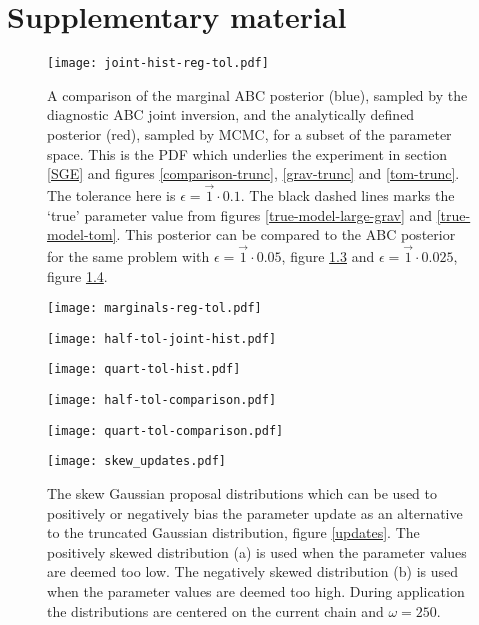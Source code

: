 \chapter{Supplementary material}
\label{supplementary-material}

\begin{figure}[H]
	\centering
	\texttt{[image: joint-hist-reg-tol.pdf]}
	\caption{A comparison of the marginal ABC posterior (blue), sampled by the diagnostic ABC joint inversion, and the analytically defined posterior (red), sampled by MCMC, for a subset of the parameter space. This is the PDF which underlies the experiment in section \ref{SGE} and figures \ref{comparison-trunc}, \ref{grav-trunc} and \ref{tom-trunc}. The tolerance here is $\epsilon = \vec{1}\cdot0.1$. The black dashed lines marks the `true' parameter value from figures \ref{true-model-large-grav} and \ref{true-model-tom}. This posterior can be compared to the ABC posterior for the same problem with $\epsilon = \vec{1}\cdot0.05$, figure \ref{pdf-half-tol} and $\epsilon = \vec{1}\cdot0.025$, figure \ref{pdf-quart-tol}.}
	\label{pdf-reg-tol}
\end{figure}

\begin{figure}[H]
	\centering
	\texttt{[image: marginals-reg-tol.pdf]}
	\caption{}
	\label{marginal-reg-tol}
\end{figure}

\begin{figure}[H]
	\centering
	\texttt{[image: half-tol-joint-hist.pdf]}
	\caption{}
	\label{pdf-half-tol}
\end{figure}

\begin{figure}[H]
	\centering
	\texttt{[image: quart-tol-hist.pdf]}
	\caption{}
	\label{pdf-quart-tol}
\end{figure}

\begin{figure}[H]
	\centering
	\texttt{[image: half-tol-comparison.pdf]}
	\caption{}
	\label{comparison-half-tol}
\end{figure}

\begin{figure}[H]
	\centering
	\texttt{[image: quart-tol-comparison.pdf]}
	\caption{}
	\label{comparison-quart-tol}
\end{figure}

\begin{figure}[H]
	\centering
	\texttt{[image: skew\_updates.pdf]}
	\caption{The skew Gaussian proposal distributions which can be used to positively or negatively bias the parameter update as an alternative to the truncated Gaussian distribution, figure \ref{updates}. The positively skewed distribution (a) is used when the parameter values are deemed too low. The negatively skewed distribution (b) is used when the parameter values are deemed too high. During application the distributions are centered on the current chain and $\omega = 250$.}
	\label{skew-updates}
\end{figure}

